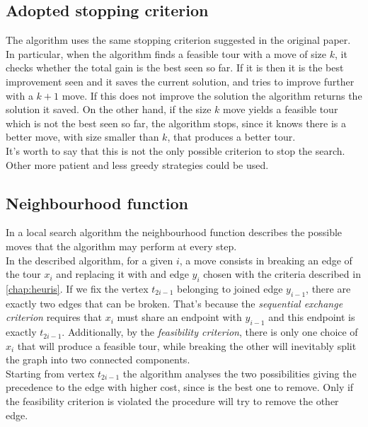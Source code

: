 \subsection{Adopted stopping criterion}
The algorithm uses the same stopping criterion suggested in the original paper. In particular, when the algorithm finds a feasible tour with a move of size $k$, it checks whether the total gain is the best seen so far. If it is then it is the best improvement seen and it saves the current solution, and tries to improve further with a $k+1$ move. If this does not improve the solution the algorithm returns the solution it saved. On the other hand, if the size $k$ move yields a feasible tour which is not the best seen so far, the algorithm stops, since it knows there is a better move, with size smaller than $k$, that produces a better tour.\\
It's worth to say that this is not the only possible criterion to stop the search. Other more patient and less greedy strategies could be used.

\subsection{Neighbourhood function}
In a local search algorithm the neighbourhood function describes the possible moves that the algorithm may perform at every step.\\
In the described algorithm, for a given $i$, a move consists in breaking an edge of the tour $x_i$ and replacing it with  and edge $y_i$ chosen with the criteria described in \cref{chap:heuris}.
If we fix the vertex $t_{2i-1}$ belonging to joined edge $y_{i-1}$, there are exactly two edges that can be broken. That's because the \emph{sequential exchange criterion} requires that $x_i$ must share an endpoint with $y_{i-1}$ and this endpoint is exactly $t_{2i-1}$. Additionally, by the \emph{feasibility criterion}, there is only one choice of $x_i$ that will produce a feasible tour, while breaking the other will inevitably split the graph into two connected components. \\
Starting from vertex $t_{2i-1}$ the algorithm analyses the two possibilities giving the precedence to the edge with higher cost, since is the best one to remove. Only if the feasibility criterion is violated the procedure will try to remove the other edge.\\

